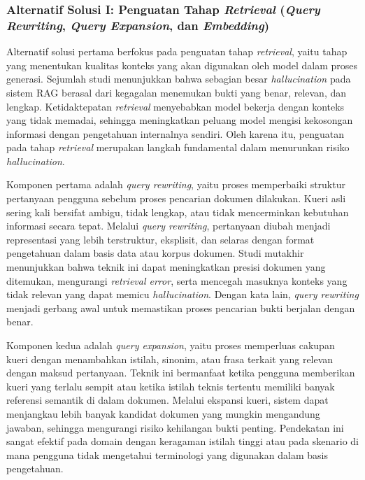 \subsubsection{Alternatif Solusi I: Penguatan Tahap \textit{Retrieval} (\textit{Query Rewriting}, \textit{Query Expansion}, dan \textit{Embedding})}

Alternatif solusi pertama berfokus pada penguatan tahap \textit{retrieval}, yaitu tahap yang menentukan kualitas konteks yang akan digunakan oleh model dalam proses generasi. Sejumlah studi menunjukkan bahwa sebagian besar \textit{hallucination} pada sistem RAG berasal dari kegagalan menemukan bukti yang benar, relevan, dan lengkap. Ketidaktepatan \textit{retrieval} menyebabkan model bekerja dengan konteks yang tidak memadai, sehingga meningkatkan peluang model mengisi kekosongan informasi dengan pengetahuan internalnya sendiri. Oleh karena itu, penguatan pada tahap \textit{retrieval} merupakan langkah fundamental dalam menurunkan risiko \textit{hallucination}.

Komponen pertama adalah \textit{query rewriting}, yaitu proses memperbaiki struktur pertanyaan pengguna sebelum proses pencarian dokumen dilakukan. Kueri asli sering kali bersifat ambigu, tidak lengkap, atau tidak mencerminkan kebutuhan informasi secara tepat. Melalui \textit{query rewriting}, pertanyaan diubah menjadi representasi yang lebih terstruktur, eksplisit, dan selaras dengan format pengetahuan dalam basis data atau korpus dokumen. Studi mutakhir menunjukkan bahwa teknik ini dapat meningkatkan presisi dokumen yang ditemukan, mengurangi \textit{retrieval error}, serta mencegah masuknya konteks yang tidak relevan yang dapat memicu \textit{hallucination}. Dengan kata lain, \textit{query rewriting} menjadi gerbang awal untuk memastikan proses pencarian bukti berjalan dengan benar.

Komponen kedua adalah \textit{query expansion}, yaitu proses memperluas cakupan kueri dengan menambahkan istilah, sinonim, atau frasa terkait yang relevan dengan maksud pertanyaan. Teknik ini bermanfaat ketika pengguna memberikan kueri yang terlalu sempit atau ketika istilah teknis tertentu memiliki banyak referensi semantik di dalam dokumen. Melalui ekspansi kueri, sistem dapat menjangkau lebih banyak kandidat dokumen yang mungkin mengandung jawaban, sehingga mengurangi risiko kehilangan bukti penting. Pendekatan ini sangat efektif pada domain dengan keragaman istilah tinggi atau pada skenario di mana pengguna tidak mengetahui terminologi yang digunakan dalam basis pengetahuan.

